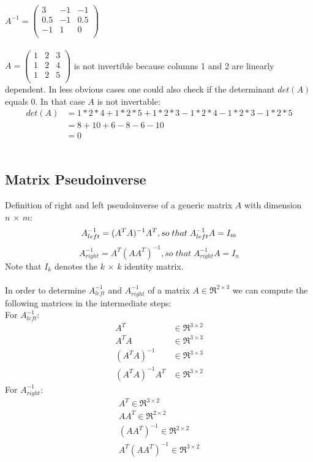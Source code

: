 \documentclass[accentcolor=tud9c]{tudexercise}
\begin{document}
	 $A^{-1} = \begin{pmatrix} 
	 3 & -1 & -1\\
	 0.5 & -1 & 0.5\\
	 -1 & 1 & 0\\
	 \end{pmatrix} $
	 \\\\
	 
	 
	  $ A = \begin{pmatrix} 
	  1 & 2 & 3 \\
	  1 & 2 & 4 \\
	  1 & 2 & 5 \\
	  \end{pmatrix} $ is not invertible because columns 1 and 2 are linearly dependent. In less obvious cases one could also check if the determinant $det(A)$ equals 0. In that case $A$ is not invertable:	  
	\begin{align*}
	det(A) &= 1*2*4 + 1*2*5 + 1*2*3 - 1*2*4 - 1*2*3 -1*2*5 \\
	&= 8 + 10 + 6 - 8 - 6 - 10 \\
	&= 0
	\end{align*}\\
	
	\subsection{Matrix Pseudoinverse}
	Definition of right and left pseudoinverse of a generic matrix $A$ with dimension $n\, \times \, m$:\\
	\[A^{-1}_{left} = (A^{T}A)^{-1}A^{T}, so\; that\; A^{-1}_{left}A=I_{m}\\ \]
	\[A^{-1}_{right} = A^{T}(AA^{T})^{-1}, so\; that\; A^{-1}_{right}A=I_{n}\]
	Note that $I_k$ denotes the $k\, \times \, k$ identity matrix.\\
	\\
	In order to determine $A^{-1}_{left}$ and $A^{-1}_{right}$ of a matrix $A \in \Re^{2\times 3}$ we can compute the following matrices in the intermediate steps:\\
	For $A^{-1}_{left}$:	
	\begin{align*}
	A^{T} &\in \Re^{3 \times 2} \\
	A^{T}A &\in \Re^{3 \times 3} \\
	(A^{T}A)^{-1} &\in \Re^{3 \times 3} \\
	(A^{T}A)^{-1}A^{T} &\in \Re^{3 \times 2}
	\end{align*}
	For $A^{-1}_{right}$:	
	\begin{align*}
	A^{T} \in \Re^{3 \times 2} \\
	AA^{T} \in \Re^{2 \times 2} \\
	(AA^{T})^{-1} \in \Re^{2 \times 2} \\
	A^{T}(AA^{T})^{-1} \in \Re^{3 \times 2}
	\end{align*}
	
\end{document}
